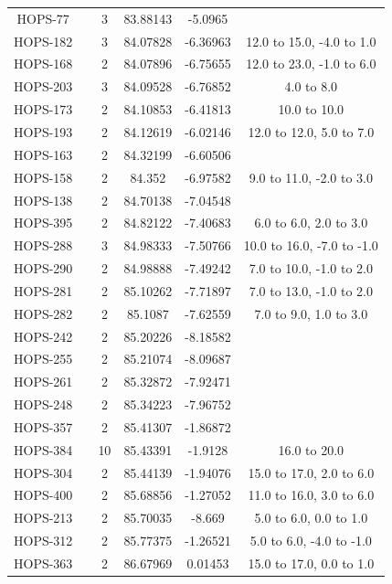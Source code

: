 \begin{deluxetable}
\begin{tabular}{cccccc}
HOPS-77 & \nodata & 3 & 83.88143 & -5.0965 & \nodata \\
HOPS-182 & \nodata & 3 & 84.07828 & -6.36963 & 12.0 to 15.0, -4.0 to 1.0 \\
HOPS-168 & \nodata & 2 & 84.07896 & -6.75655 & 12.0 to 23.0, -1.0 to 6.0 \\
HOPS-203 & \nodata & 3 & 84.09528 & -6.76852 & 4.0 to 8.0 \\
HOPS-173 & \nodata & 2 & 84.10853 & -6.41813 & 10.0 to 10.0 \\
HOPS-193 & \nodata & 2 & 84.12619 & -6.02146 & 12.0 to 12.0, 5.0 to 7.0 \\
HOPS-163 & \nodata & 2 & 84.32199 & -6.60506 & \nodata \\
HOPS-158 & \nodata & 2 & 84.352 & -6.97582 & 9.0 to 11.0, -2.0 to 3.0 \\
HOPS-138 & \nodata & 2 & 84.70138 & -7.04548 & \nodata \\
HOPS-395 & \nodata & 2 & 84.82122 & -7.40683 & 6.0 to 6.0, 2.0 to 3.0 \\
HOPS-288 & \nodata & 3 & 84.98333 & -7.50766 & 10.0 to 16.0, -7.0 to -1.0 \\
HOPS-290 & \nodata & 2 & 84.98888 & -7.49242 & 7.0 to 10.0, -1.0 to 2.0 \\
HOPS-281 & \nodata & 2 & 85.10262 & -7.71897 & 7.0 to 13.0, -1.0 to 2.0 \\
HOPS-282 & \nodata & 2 & 85.1087 & -7.62559 & 7.0 to 9.0, 1.0 to 3.0 \\
HOPS-242 & \nodata & 2 & 85.20226 & -8.18582 & \nodata \\
HOPS-255 & \nodata & 2 & 85.21074 & -8.09687 & \nodata \\
HOPS-261 & \nodata & 2 & 85.32872 & -7.92471 & \nodata \\
HOPS-248 & \nodata & 2 & 85.34223 & -7.96752 & \nodata \\
HOPS-357 & \nodata & 2 & 85.41307 & -1.86872 & \nodata \\
HOPS-384 & \nodata & 10 & 85.43391 & -1.9128 & 16.0 to 20.0 \\
HOPS-304 & \nodata & 2 & 85.44139 & -1.94076 & 15.0 to 17.0, 2.0 to 6.0 \\
HOPS-400 & \nodata & 2 & 85.68856 & -1.27052 & 11.0 to 16.0, 3.0 to 6.0 \\
HOPS-213 & \nodata & 2 & 85.70035 & -8.669 & 5.0 to 6.0, 0.0 to 1.0 \\
HOPS-312 & \nodata & 2 & 85.77375 & -1.26521 & 5.0 to 6.0, -4.0 to -1.0 \\
HOPS-363 & \nodata & 2 & 86.67969 & 0.01453 & 15.0 to 17.0, 0.0 to 1.0 \\

\end{tabular}
\end{deluxetable}
